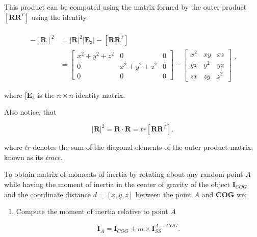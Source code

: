 \begin{itemize}
        This product can be computed using the matrix formed by the outer product
        $[\mathbf{R} \mathbf{R}^{T}]$ using the identity

        \begin{equation}
            \begin{array}{ll}
                 \\
                -[\mathbf{R}]^{2}
                &= |\mathbf{R}|^{2}|\mathbf{E}_{3}| - [\mathbf{R}\mathbf{R}^{T}] \\
                &= \begin{bmatrix}
                    x^{2} + y^{2} + z^{2} & 0 & 0 \\
                    0 & x^{2} + y^{2} + z^{2} & 0 \\
                    0 & 0 & 0
                \end{bmatrix} - \begin{bmatrix}
                    x^{2} & xy & xz \\
                    yx & y^{2} & yz \\
                    zx & zy & z^{2}
                \end{bmatrix}
            \end{array}
        ,\end{equation}

        where $[\mathbf{E}_{3}$ is the $n \times n$  identity matrix.

        Also notice, that

        \begin{equation}
            |\mathbf{R}|^{2} = \mathbf{R} \cdot \mathbf{R} = tr [\mathbf{R}\mathbf{R}^{T}]
        .\end{equation}

        where $tr$ denotes the sum of the diagonal elements of the outer product
        matrix, known as its \textit{trace}.

        To obtain matrix of moments of inertia by rotating about any random
        point $A$ while having the moment of inertia in the center of gravity of
        the object $\mathbf{I}_{COG}$ and the coordinate distance $d = [x, y, z]$
        between the point $A$ and \textbf{COG} we:

        \begin{enumerate}
            \item Compute the moment of inertia relative to point $A$

                 \begin{equation}
                    \mathbf{I}_{A} = \mathbf{I}_{COG} + m \times \mathbf{I}_{SS}^{A \to COG}
                .\end{equation}


\end{enumerate}
\end{itemize}
